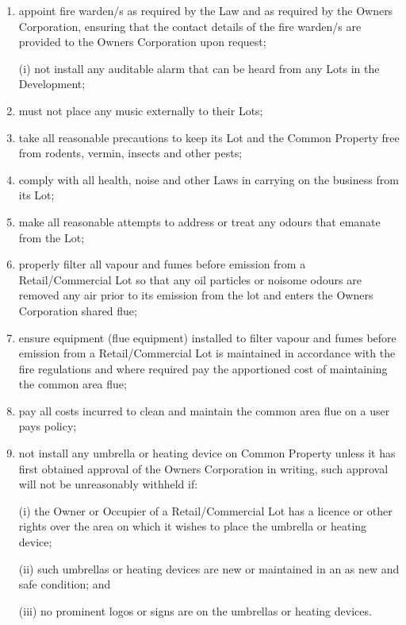 \documentclass{article}
\begin{document}
\begin{enumerate}[label=\arabic*.]
\begin{enumerate}[label=\arabic{enumi}.\arabic*.]
\begin{enumerate}[label=\arabic{enumi}.\arabic*.]
\begin{enumerate}[label=(\arabic*)]
\begin{enumerate}[label=(\alph*)]
\item  appoint fire warden/s as required by the Law and as required by the Owners Corporation, ensuring that the contact details of the fire warden/s are provided to the Owners Corporation upon request;

(i) not install any auditable alarm that can be heard from any Lots in the Development;

\item  must not place any music externally to their Lots;

\item  take all reasonable precautions to keep its Lot and the Common Property free from rodents, vermin, insects and other pests;

\item  comply with all health, noise and other Laws in carrying on the business from its Lot;

\item  make all reasonable attempts to address or treat any odours that emanate from the Lot;

\item  properly filter all vapour and fumes before emission from a Retail/Commercial Lot so that any oil particles or noisome odours are removed any air prior to its emission from the lot and enters the Owners Corporation shared flue;

\item  ensure equipment (flue equipment) installed to filter vapour and fumes before emission from a Retail/Commercial Lot is maintained in accordance with the fire regulations and where required pay the apportioned cost of maintaining the common area flue;

\item  pay all costs incurred to clean and maintain the common area flue on a user pays policy;

\item  not install any umbrella or heating device on Common Property unless it has first obtained approval of the Owners Corporation in writing, such approval will not be unreasonably withheld if:

(i) the Owner or Occupier of a Retail/Commercial Lot has a licence or other rights over the area on which it wishes to place the umbrella or heating device;

(ii) such umbrellas or heating devices are new or maintained in an as new and safe condition; and

(iii) no prominent logos or signs are on the umbrellas or heating devices.


\end{enumerate}
\end{enumerate}
\end{enumerate}
\end{enumerate}
\end{enumerate}
\end{document}
